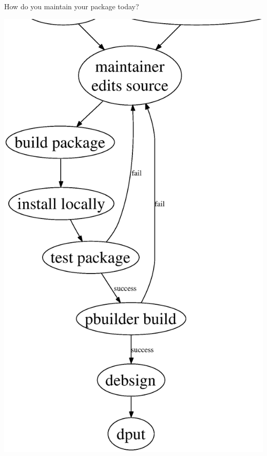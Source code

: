 \documentclass[dvipdfm,17pt,times]{beamer}
\begin{document}
\begin{frame}{}
  \begin{minipage}{0.4\hsize}
   How do you maintain your package today?
  \end{minipage}
 \begin{minipage}{0.5\hsize}
  \includegraphics[height=0.95\vsize]{develcycle.eps}
 \end{minipage}
\end{frame}
 
\end{document}
